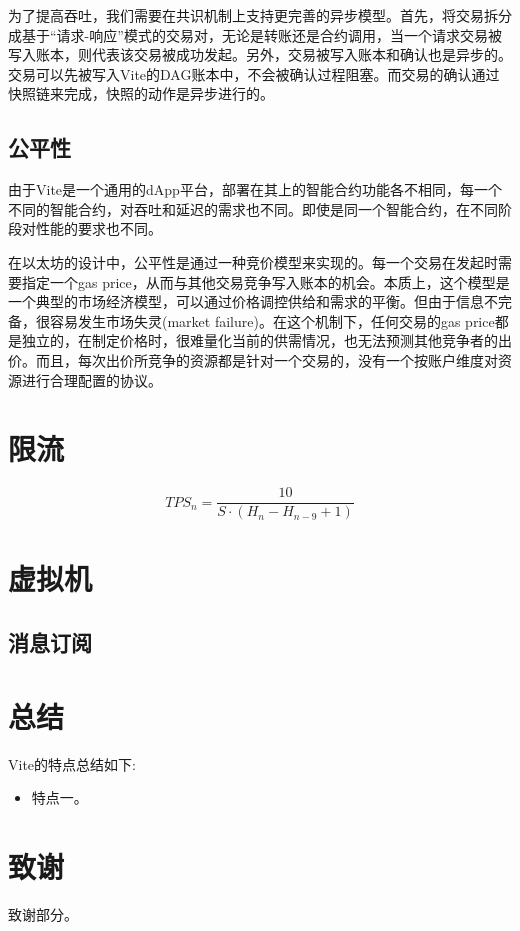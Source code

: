 \documentclass[UTF8,nofonts]{ctexart}
\begin{document}
\begin{multicols}{2}
为了提高吞吐，我们需要在共识机制上支持更完善的异步模型。首先，将交易拆分成基于“请求-响应”模式的交易对，无论是转账还是合约调用，当一个请求交易被写入账本，则代表该交易被成功发起。另外，交易被写入账本和确认也是异步的。交易可以先被写入Vite的DAG账本中，不会被确认过程阻塞。而交易的确认通过快照链来完成，快照的动作是异步进行的。

\subsection{公平性}
由于Vite是一个通用的dApp平台，部署在其上的智能合约功能各不相同，每一个不同的智能合约，对吞吐和延迟的需求也不同。即使是同一个智能合约，在不同阶段对性能的要求也不同。

在以太坊的设计中，公平性是通过一种竞价模型来实现的。每一个交易在发起时需要指定一个gas price，从而与其他交易竞争写入账本的机会。本质上，这个模型是一个典型的市场经济模型，可以通过价格调控供给和需求的平衡。但由于信息不完备，很容易发生市场失灵(market failure)。在这个机制下，任何交易的gas price都是独立的，在制定价格时，很难量化当前的供需情况，也无法预测其他竞争者的出价。而且，每次出价所竞争的资源都是针对一个交易的，没有一个按账户维度对资源进行合理配置的协议。


\section{限流}
$$
TPS_{n} =  \frac{10}{S\cdot(H_{n}  -  H_{n-9} + 1)}
$$

\section{虚拟机}
\subsection{消息订阅}

\section{总结}

Vite的特点总结如下:

\begin{itemize}
	\item 特点一。
\end{itemize}

\section{致谢}
致谢部分。

\end{multicols}



\end{document}

